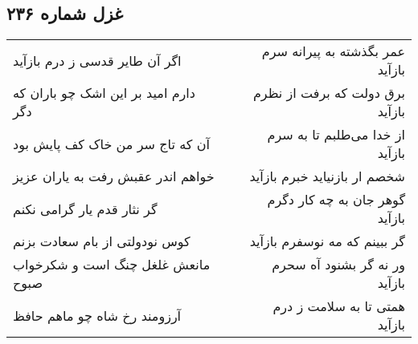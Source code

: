 \begin{center}
\section*{غزل شماره ۲۳۶}
\label{sec:sh236}
\begin{longtable}{l p{0.5cm} r}
اگر آن طایر قدسی ز درم بازآید
&&
عمر بگذشته به پیرانه سرم بازآید
\\
دارم امید بر این اشک چو باران که دگر
&&
برق دولت که برفت از نظرم بازآید
\\
آن که تاج سر من خاک کف پایش بود
&&
از خدا می‌طلبم تا به سرم بازآید
\\
خواهم اندر عقبش رفت به یاران عزیز
&&
شخصم ار بازنیاید خبرم بازآید
\\
گر نثار قدم یار گرامی نکنم
&&
گوهر جان به چه کار دگرم بازآید
\\
کوس نودولتی از بام سعادت بزنم
&&
گر ببینم که مه نوسفرم بازآید
\\
مانعش غلغل چنگ است و شکرخواب صبوح
&&
ور نه گر بشنود آه سحرم بازآید
\\
آرزومند رخ شاه چو ماهم حافظ
&&
همتی تا به سلامت ز درم بازآید
\\
\end{longtable}
\end{center}
